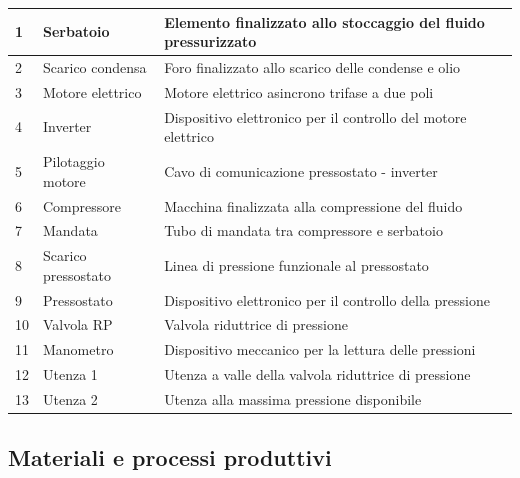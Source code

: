 \begin{tabular}{|l|l|l|}
\hline
    1 & Serbatoio & Elemento finalizzato allo stoccaggio del fluido pressurizzato\\
    \hline
    2 & Scarico condensa & Foro finalizzato allo scarico delle condense e olio\\
    \hline
    3 & Motore elettrico & Motore elettrico asincrono trifase a due poli\\
    \hline
    4 & Inverter & Dispositivo elettronico per il controllo del motore elettrico\\
    \hline
    5 & Pilotaggio motore & Cavo di comunicazione pressostato - inverter\\
    \hline
    6 & Compressore & Macchina finalizzata alla compressione del fluido\\
    \hline
    7 & Mandata & Tubo di mandata tra compressore e serbatoio\\
    \hline
    8 & Scarico pressostato & Linea di pressione funzionale al pressostato\\
    \hline
    9 & Pressostato & Dispositivo elettronico per il controllo della pressione\\
    \hline
    10 & Valvola RP & Valvola riduttrice di pressione \\
    \hline
    11 & Manometro & Dispositivo meccanico per la lettura delle pressioni\\
    \hline
    12 & Utenza 1 & Utenza a valle della valvola riduttrice di pressione\\
    \hline
    13 & Utenza 2 & Utenza alla massima pressione disponibile\\
    \hline
\end{tabular}
\subsection{Materiali e processi produttivi} 

